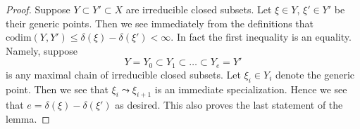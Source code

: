 \documentclass[10pt,a4paper]{amsart}
\theoremstyle{plain}
\theoremstyle{definition}
\theoremstyle{remark}
\numberwithin{equation}{subsection}
\begin{document}
\begin{proof}
Suppose $Y \subset Y' \subset X$ are irreducible closed subsets.
Let $\xi \in Y$, $\xi' \in Y'$ be their generic points.
Then we see immediately from the definitions that
$\text{codim}(Y, Y') \leq \delta(\xi) - \delta(\xi') < \infty$.
In fact the first inequality is an equality. Namely, suppose
$$
Y = Y_0 \subset Y_1 \subset \ldots \subset Y_e = Y'
$$
is any maximal chain of irreducible closed subsets. Let
$\xi_i \in Y_i$ denote the generic point. Then we see that
$\xi_i \leadsto \xi_{i + 1}$ is an immediate specialization.
Hence we see that $e = \delta(\xi) - \delta(\xi')$ as desired.
This also proves the last statement of the lemma.
\end{proof}
\end{document}
